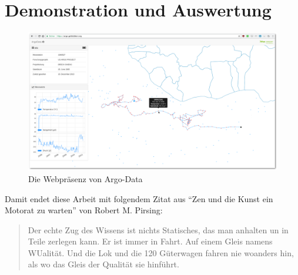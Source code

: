 \section{Demonstration und Auswertung}


\begin{figure}[H]
 \centering
 \includegraphics[width=\textwidth]{pix/argodata_complete.png}
 \caption{Die Webpräsenz von Argo-Data}
 \label{fig:argodataWeb}
\end{figure}




Damit endet diese Arbeit mit folgendem Zitat aus "`Zen und die Kunst ein Motorat zu warten"' von Robert M. Pirsing:

\begin{quotation}
 Der echte Zug des Wissens ist nichts Statisches, das man anhalten un in Teile zerlegen kann. Er ist immer in Fahrt. Auf einem Gleis namens WUalität. Und die Lok und die 120 Güterwagen fahren nie woanders hin, als wo das Gleis der Qualität sie hinführt.
\end{quotation} 

